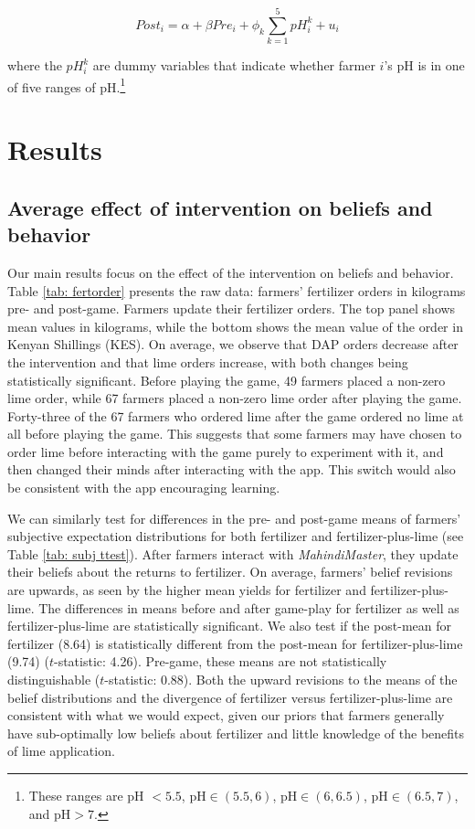 \documentclass[12pt,letterpaper]{article}
\begin{document}
 \begin{equation}
 Post_i = \alpha + \beta Pre_i + \phi_{k} \sum_{k=1}^{5}pH_{i}^k + u_i
 \end{equation}

\noindent where the $pH_{i}^k$ are dummy variables that indicate whether farmer $i$'s pH is in one of five ranges of pH.\footnote{These ranges are pH $<5.5$, pH$\in(5.5,6)$, pH$\in(6,6.5)$, pH$\in(6.5,7)$, and pH$>7$.}
 
 \section{Results}\label{sec:results}


\subsection{Average effect of intervention on beliefs and behavior}\label{subsec:average_effect}

Our main results focus on the effect of the intervention on beliefs and behavior. Table \ref{tab: fertorder} presents the raw data: farmers' fertilizer orders in kilograms pre- and post-game. Farmers update their fertilizer orders. The top panel shows mean values in kilograms, while the bottom shows the mean value of the order in Kenyan Shillings (KES). On average, we observe that DAP orders decrease after the intervention and that lime orders increase, with both changes being statistically significant. Before playing the game, 49 farmers placed a non-zero lime order, while 67 farmers placed a non-zero lime order after playing the game. Forty-three of the 67 farmers who ordered lime after the game ordered no lime at all before playing the game. This suggests that some farmers may have chosen to order lime before interacting with the game purely to experiment with it, and then changed their minds after interacting with the app. This switch would also be consistent with the app encouraging learning. 



We can similarly test for differences in the pre- and post-game means of farmers' subjective expectation distributions for both fertilizer and fertilizer-plus-lime (see Table \ref{tab: subj ttest}). After farmers interact with \textit{MahindiMaster}, they update their beliefs about the returns to fertilizer. On average, farmers' belief revisions are upwards, as seen by the higher mean yields for fertilizer and fertilizer-plus-lime. The differences in means before and after game-play for fertilizer as well as fertilizer-plus-lime are statistically significant. We also test if the post-mean for fertilizer (8.64) is statistically different from the post-mean for fertilizer-plus-lime (9.74) ($t$-statistic: 4.26). Pre-game, these means are not statistically distinguishable ($t$-statistic: 0.88). Both the upward revisions to the means of the belief distributions and the divergence of fertilizer versus fertilizer-plus-lime are consistent with what we would expect, given our priors that farmers generally have sub-optimally low beliefs about fertilizer and little knowledge of the benefits of lime application.
\end{document}
